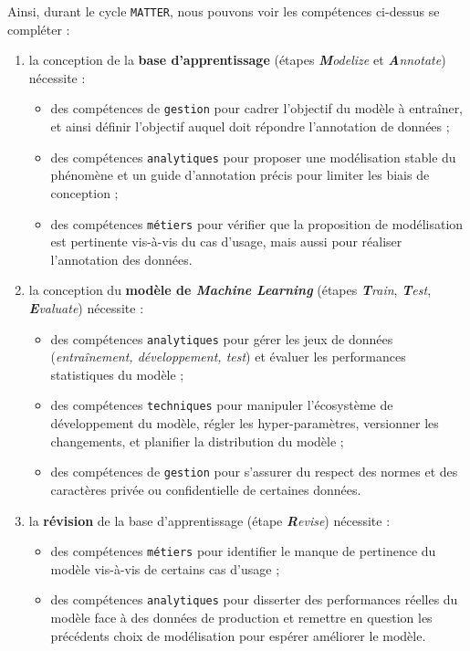 		Ainsi, durant le cycle \texttt{MATTER}, nous pouvons voir les compétences ci-dessus se compléter :
		\begin{enumerate}
			\item la conception de la \textbf{base d'apprentissage} (étapes \textit{\textbf{M}odelize} et \textit{\textbf{A}nnotate}) nécessite :
			\begin{itemize}
				\item des compétences de \texttt{gestion} pour cadrer l'objectif du modèle à entraîner, et ainsi définir l'objectif auquel doit répondre l'annotation de données ;
				\item des compétences \texttt{analytiques} pour proposer une modélisation stable du phénomène et un guide d'annotation précis pour limiter les biais de conception ;
				\item des compétences \texttt{métiers} pour vérifier que la proposition de modélisation est pertinente vis-à-vis du cas d'usage, mais aussi pour réaliser l'annotation des données.
			\end{itemize}
			\item la conception du \textbf{modèle de \textit{Machine Learning}} (étapes \textit{\textbf{T}rain}, \textit{\textbf{T}est}, \textit{\textbf{E}valuate}) nécessite :
			\begin{itemize}
				\item des compétences \texttt{analytiques} pour gérer les jeux de données (\textit{entraînement, développement, test}) et évaluer les performances statistiques du modèle ;
				\item des compétences \texttt{techniques} pour manipuler l'écosystème de développement du modèle, régler les hyper-paramètres, versionner les changements, et planifier la distribution du modèle ;
				\item des compétences de \texttt{gestion} pour s'assurer du respect des normes et des caractères privée ou confidentielle de certaines données.
			\end{itemize}
			\item la \textbf{révision} de la base d'apprentissage (étape \textit{\textbf{R}evise}) nécessite :
			\begin{itemize}
				\item des compétences \texttt{métiers} pour identifier le manque de pertinence du modèle vis-à-vis de certains cas d'usage ;
				\item des compétences \texttt{analytiques} pour disserter des performances réelles du modèle face à des données de production et remettre en question les précédents choix de modélisation pour espérer améliorer le modèle.
			\end{itemize}
		\end{enumerate}
		
